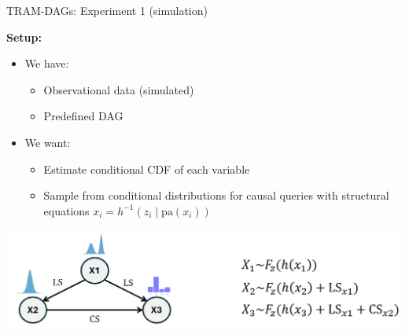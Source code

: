 \documentclass[onlytextwidth,english]{beamer}\usepackage[]{graphicx}\usepackage[]{xcolor}
\begin{document}
\begin{frame}{TRAM-DAGs: Experiment 1 (simulation)}

\textbf{Setup:}

  \begin{itemize}
    \item We have:
    \begin{itemize}
      \item Observational data (simulated)
      \item Predefined DAG
    \end{itemize}
    \item We want:
    \begin{itemize}
      \item Estimate conditional CDF of each variable
      \item Sample from conditional distributions for causal queries with structural equations $x_i = h^{-1}(z_i \mid \text{pa}(x_i))$
    \end{itemize}
  \end{itemize}

  \vfill
  \centering
  \includegraphics[width=0.7\linewidth]{img/Simulation_Example.png}
\end{frame}



% 
% 
% 
% 
% 
% 
% 
% 
% 
% 
\end{document}
